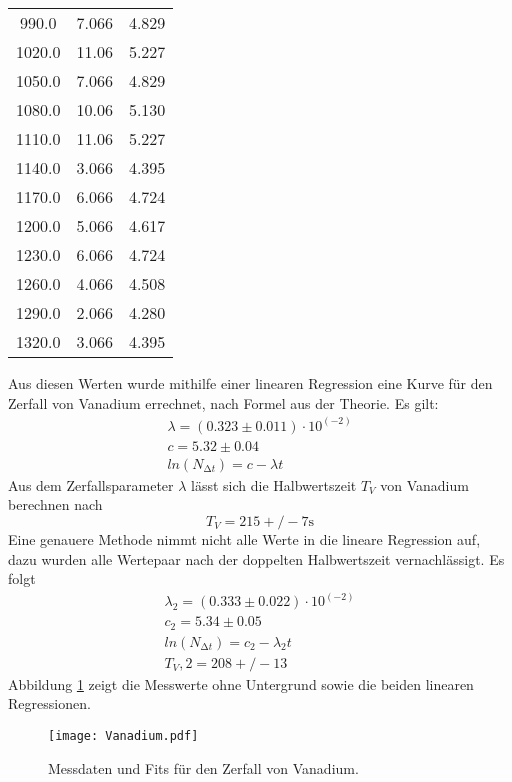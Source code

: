 \begin{table}
\begin{tabular}{c c c}
  990.0   & 7.066  & 4.829  \\
  1020.0  & 11.06  & 5.227  \\
  1050.0  & 7.066  & 4.829  \\
  1080.0  & 10.06  & 5.130  \\
  1110.0  & 11.06  & 5.227  \\
  1140.0  & 3.066  & 4.395  \\
  1170.0  & 6.066  & 4.724  \\
  1200.0  & 5.066  & 4.617  \\
  1230.0  & 6.066  & 4.724  \\
  1260.0  & 4.066  & 4.508  \\
  1290.0  & 2.066  & 4.280  \\
  1320.0  & 3.066  & 4.395  \\
  \bottomrule
 \end{tabular}
\end{table}

\noindent Aus diesen Werten wurde mithilfe einer linearen Regression
eine Kurve für den Zerfall von Vanadium errechnet, nach Formel %
aus der Theorie. Es gilt:
\begin{align}
    \lambda = (0.323 \pm 0.011) \cdot 10^(-2) \\
    c = 5.32 \pm 0.04 \\
    ln(N_{\increment t}) = c - \lambda t 
\end{align}
Aus dem Zerfallsparameter $\lambda$ lässt sich die Halbwertszeit $T_V$ von
Vanadium berechnen nach %
\begin{equation}
    T_V = 215+/-7 \si{\s}
\end{equation}
Eine genauere Methode nimmt nicht alle Werte in die lineare Regression auf,
dazu wurden alle Wertepaar nach der doppelten Halbwertszeit vernachlässigt.
Es folgt
\begin{align}
    \lambda_2 = (0.333 \pm 0.022) \cdot 10^(-2) \\
    c_2 = 5.34 \pm 0.05 \\
    ln(N_{\increment t}) = c_2 - \lambda_2 t \\
    T_V,2 = 208+/-13
\end{align}
Abbildung \ref{fig:vankurve}
zeigt die Messwerte ohne Untergrund sowie die beiden linearen Regressionen.

\begin{figure}
 \centering
 \texttt{[image: Vanadium.pdf]}
 \caption{Messdaten und Fits für den Zerfall von Vanadium.}
 \label{fig:vankurve}
\end{figure}

